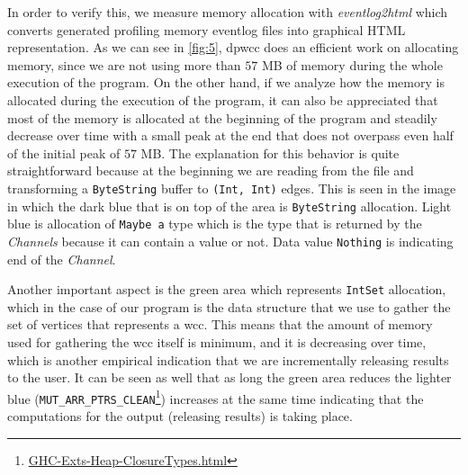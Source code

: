 In order to verify this, we measure memory allocation with \textit{eventlog2html} which converts generated profiling memory eventlog files into graphical HTML representation. 
As we can see in \autoref{fig:5}, \acrshort{dpwcc} does an efficient work on allocating memory, since we are not using more than $57$ MB of memory during the whole execution of the program.
On the other hand, if we analyze how the memory is allocated during the execution of the program, it can also be appreciated that most of the memory is allocated at the beginning of the program and steadily decrease over time with a small peak at the end that does not overpass even half of the initial peak of $57$ MB. The explanation for this behavior is quite straightforward because at the beginning we are reading from the file and transforming a \texttt{ByteString} buffer to \texttt{(Int, Int)} edges. This is seen in the image in which the dark blue that is on top of the area is \texttt{ByteString} allocation. Light blue is allocation of \texttt{Maybe a} type which is the type that is returned by the \textit{Channels} because it can contain a value or not. Data value \texttt{Nothing} is indicating end of the \textit{Channel}.  

Another important aspect is the green area which represents \texttt{IntSet} allocation, which in the case of our program is the data structure that we use to gather the set of vertices that represents a \acrshort{wcc}. This means that the amount of memory used for gathering the \acrshort{wcc} itself is minimum, and it is decreasing over time, which is another empirical indication that we are incrementally releasing results to the user. It can be seen as well that as long the green area reduces the lighter blue (\texttt{MUT_ARR_PTRS_CLEAN}\footnote{\href{https://downloads.haskell.org/~ghc/8.10.4/docs/html/libraries/ghc-heap-8.10.4/GHC-Exts-Heap-ClosureTypes.html}{GHC-Exts-Heap-ClosureTypes.html}}) increases at the same time indicating that the computations for the output (releasing results) is taking place. 

